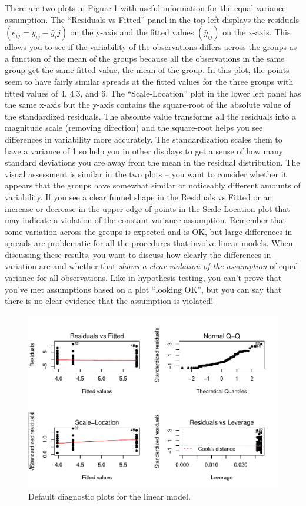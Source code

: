\documentclass[]{book}
\begin{document}
There are two plots in Figure \ref{fig:Figure3-9} with useful
information for the equal variance assumption. The ``Residuals vs
Fitted'' panel in the top left displays the residuals
\((e_{ij} = y_{ij}-\hat{y}_ij)\) on the y-axis and the fitted values
\((\hat{y}_{ij})\) on the x-axis. This allows you to see if the
variability of the observations differs across the groups as a function
of the mean of the groups because all the observations in the same group
get the same fitted value, the mean of the group. In this plot, the
points seem to have fairly similar spreads at the fitted values for the
three groups with fitted values of 4, 4.3, and 6. The ``Scale-Location''
plot in the lower left panel has the same x-axis but the y-axis contains
the square-root of the absolute value of the standardized residuals. The
absolute value transforms all the residuals into a magnitude scale
(removing direction) and the square-root helps you see differences in
variability more accurately. The standardization scales them to have a
variance of 1 so help you in other displays to get a sense of how many
standard deviations you are away from the mean in the residual
distribution. The visual assessment is similar in the two plots -- you
want to consider whether it appears that the groups have somewhat
similar or noticeably different amounts of variability. If you see a
clear funnel shape in the Residuals vs Fitted or an increase or decrease
in the upper edge of points in the Scale-Location plot that may indicate
a violation of the constant variance assumption. Remember that some
variation across the groups is expected and is OK, but large differences
in spreads are problematic for all the procedures that involve linear
models. When discussing these results, you want to discuss how clearly
the differences in variation are and whether that \emph{shows a clear
violation of the assumption} of equal variance for all observations.
Like in hypothesis testing, you can't prove that you've met assumptions
based on a plot ``looking OK'', but you can say that there is no clear
evidence that the assumption is violated!



\begin{figure}
\centering
\includegraphics{GreenwoodBanner_files/figure-latex/Figure3-9-1.pdf}
\caption{\label{fig:Figure3-9}Default diagnostic plots for the linear model.}
\end{figure}
\end{document}
